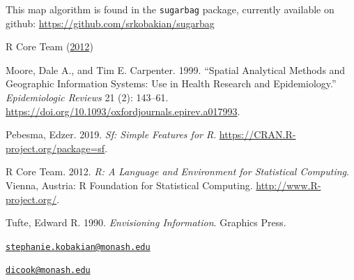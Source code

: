 This map algorithm is found in the \texttt{sugarbag} package, currently
available on github: \url{https://github.com/srkobakian/sugarbag}

R Core Team (\protect\hyperlink{ref-R}{2012})



\hypertarget{refs}{}
\leavevmode\hypertarget{ref-SAMGIS}{}%
Moore, Dale A., and Tim E. Carpenter. 1999. ``Spatial Analytical Methods
and Geographic Information Systems: Use in Health Research and
Epidemiology.'' \emph{Epidemiologic Reviews} 21 (2): 143--61.
\url{https://doi.org/10.1093/oxfordjournals.epirev.a017993}.

\leavevmode\hypertarget{ref-sf}{}%
Pebesma, Edzer. 2019. \emph{Sf: Simple Features for R}.
\url{https://CRAN.R-project.org/package=sf}.

\leavevmode\hypertarget{ref-R}{}%
R Core Team. 2012. \emph{R: A Language and Environment for Statistical
Computing}. Vienna, Austria: R Foundation for Statistical Computing.
\url{http://www.R-project.org/}.

\leavevmode\hypertarget{ref-EI}{}%
Tufte, Edward R. 1990. \emph{Envisioning Information}. Graphics Press.



\address{%
Stephanie Kobakian\\
Queensland University of Technology\\
\\
}
\href{mailto:stephanie.kobakian@monash.edu}{\nolinkurl{stephanie.kobakian@monash.edu}}

\address{%
Dianne Cook\\
Monash University\\
\\
}
\href{mailto:dicook@monash.edu}{\nolinkurl{dicook@monash.edu}}

